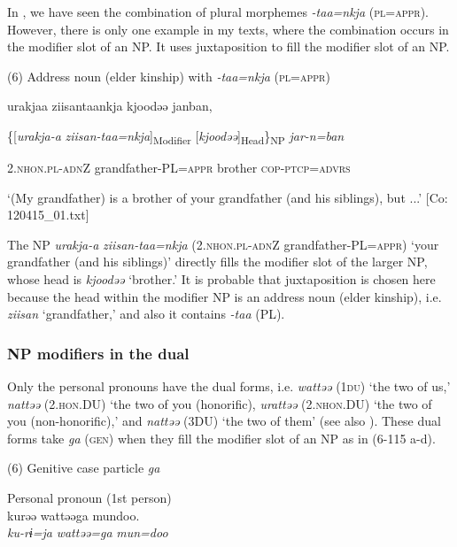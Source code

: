 In , we have seen the combination of plural morphemes \textit{{}-taa=nkja} (\textsc{pl}=\textsc{appr}). However, there is only one example in my texts, where the combination occurs in the modifier slot of an NP. It uses juxtaposition to fill the modifier slot of an NP.

(6)  Address noun (elder kinship) with \textit{{}-taa=nkja} (\textsc{pl}=\textsc{appr})

{\TM}
\gll urakjaa  ziisantaankja  kjoodəə  janban,

    \{[\textit{urakja-a}  \textit{ziisan-taa=nkja}]\textsubscript{Modifier}  [\textit{kjoodəə}]\textsubscript{Head}\}\textsubscript{NP}  \textit{jar-n=ban}

    2.\textsc{nhon}.\textsc{pl}-\textsc{adn}Z  grandfather{}-PL=\textsc{appr}  brother  \textsc{cop}-\textsc{ptcp}=\textsc{advrs}

\glt    ‘(My grandfather) is a brother of your grandfather (and his siblings), but ...’ [Co: 120415\_01.txt]
\z

The NP \textit{urakja-a} \textit{ziisan-taa=nkja} (2.\textsc{nhon}.\textsc{pl}-\textsc{adn}Z grandfather-PL=\textsc{appr}) ‘your grandfather (and his siblings)’ directly fills the modifier slot of the larger NP, whose head is \textit{kjoodəə} ‘brother.’ It is probable that juxtaposition is chosen here because the head within the modifier NP is an address noun (elder kinship), i.e. \textit{ziisan} ‘grandfather,’ and also it contains \textit{-taa} (PL).

\subsubsection{NP modifiers in the dual}

Only the personal pronouns have the dual forms, i.e. \textit{wattəə} (1\textsc{du}) ‘the two of us,’ \textit{nattəə} (2.\textsc{hon}.DU) ‘the two of you (honorific), \textit{urattəə} (2.\textsc{nhon}.DU) ‘the two of you (non-honorific),’ and \textit{nattəə} (3DU) ‘the two of them’ (see also ). These dual forms take \textit{ga} (\textsc{gen}) when they fill the modifier slot of an NP as in (6-115 a-d).

(6)  Genitive case particle \textit{ga}

 \ea Personal pronoun (1st person)\\
{\TM}
\gll  kurəə  wattəəga  mundoo.\\

      \textit{ku-rɨ=ja}  \textit{wattəə=ga}  \textit{mun=doo}


